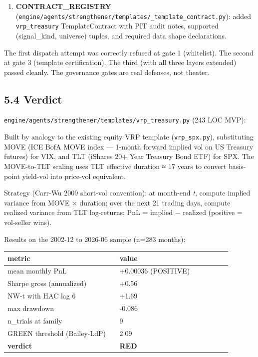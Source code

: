 \documentclass[11pt,a4paper]{article}
\begin{document}
\begin{enumerate}[leftmargin=*]
\item \textbf{CONTRACT\_REGISTRY} (\texttt{engine/agents/strengthener/templates/\_template\_contract.py}): added \texttt{vrp\_treasury} TemplateContract with PIT audit notes, supported (signal\_kind, universe) tuples, and required data shape declarations.
\end{enumerate}

The first dispatch attempt was correctly refused at gate 1 (whitelist). The second at gate 3 (template certification). The third (with all three layers extended) passed cleanly. The governance gates are real defenses, not theater.

\subsection{5.4 Verdict}

\texttt{engine/agents/strengthener/templates/vrp\_treasury.py} (243 LOC MVP):

Built by analogy to the existing equity VRP template (\texttt{vrp\_spx.py}), substituting MOVE (ICE BofA MOVE index — 1-month forward implied vol on US Treasury futures) for VIX, and TLT (iShares 20+ Year Treasury Bond ETF) for SPX. The MOVE-to-TLT scaling uses TLT effective duration ≈ 17 years to convert basis-point yield-vol into price-vol equivalent.

Strategy (Carr-Wu 2009 short-vol convention): at month-end \textit{t}, compute implied variance from MOVE × duration; over the next 21 trading days, compute realized variance from TLT log-returns; PnL = implied − realized (positive = vol-seller wins).

Results on the 2002-12 to 2026-06 sample (n=283 months):

\begin{center}
\small
\begin{tabular}{p{0.475\linewidth}p{0.475\linewidth}}
\toprule
\textbf{metric} & \textbf{value} \\
\midrule
mean monthly PnL & +0.00036 (POSITIVE) \\
Sharpe gross (annualized) & +0.56 \\
NW-t with HAC lag 6 & +1.69 \\
max drawdown & -0.086 \\
n\_trials at family & 9 \\
GREEN threshold (Bailey-LdP) & 2.09 \\
\textbf{verdict} & \textbf{RED} \\
\bottomrule
\end{tabular}
\end{center}
\end{document}
